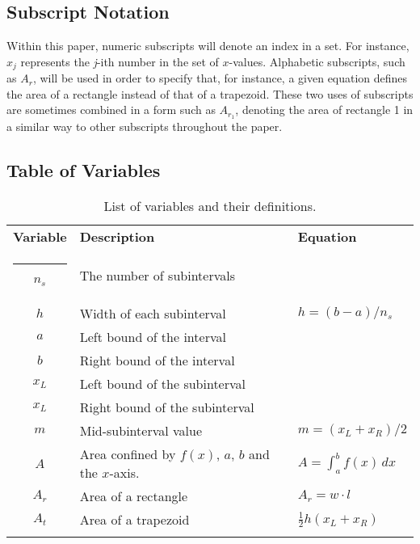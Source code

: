 \documentclass{paper}
\begin{document}
\subsection{Subscript Notation}
Within this paper, numeric subscripts will denote an index in a set.
For instance, \(x_j\) represents the \emph{j}-ith number in the set of \(x\)-values.
Alphabetic subscripts, such as \(A_r\), will be used in order to specify that, for instance, a given equation defines the area of a rectangle instead of that of a trapezoid.
These two uses of subscripts are sometimes combined in a form such as \(A_{r_1}\), denoting the area of rectangle 1 in a similar way to other subscripts throughout the paper.
%
\subsection{Table of Variables}
\renewcommand{\arraystretch}{1.1}
\begin{table}[ht]
    \centering
    \begin{tabular}{c|l|l}
            \dtoprule
            \textbf{Variable}   &   \textbf{Description}            &   \textbf{Equation}       \\
            \hrule
            \(n_s\)             &   The number of subintervals      &                           \\
            \(h\)               &   Width of each subinterval       &   \(h=(b-a)/n_s\)         \\
            \(a\)               &   Left bound of the interval      &                           \\
            \(b\)               &   Right bound of the interval     &                           \\
            \(x_L\)             &   Left bound of the subinterval   &                           \\
            \(x_L\)             &   Right bound of the subinterval  &                           \\
            \(m\)               &   Mid-subinterval value           &   \(m=(x_L+x_R)/2\)       \\
            \(A\)               &   Area confined by \(f(x)\), \(a\), \(b\) and the \(x\)-axis. & \(A=\int_a^b f(x) \, dx\) \\
            \(A_r\)             &   Area of a rectangle             &   \(A_r=w \cdot l\)       \\
            \(A_t\)             &   Area of a trapezoid             &   \(\frac{1}{2} h (x_L + x_R)\)  \\
            \dbottomrule
    \end{tabular}
    \caption{List of variables and their definitions.}
    \label{table:variables}
\end{table}
%
\end{document}
